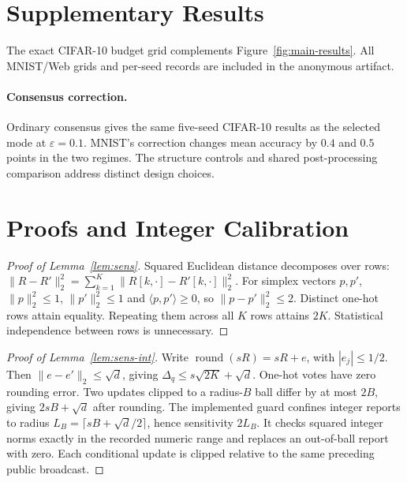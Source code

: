\appendix

\section{Supplementary Results}
\label{app:full-results}
The exact CIFAR-10 budget grid complements Figure~\ref{fig:main-results}.
All MNIST/Web grids and per-seed records are included in the anonymous artifact.









\paragraph{Consensus correction.}
Ordinary consensus gives the same five-seed CIFAR-10 results as the selected
mode at $\varepsilon=0.1$. MNIST's correction changes mean accuracy by $0.4$
and $0.5$ points in the two regimes. The structure controls and shared
post-processing comparison address distinct design choices.


\section{Proofs and Integer Calibration}
\label{app:proofs}

\begin{proof}[Proof of Lemma~\ref{lem:sens}]
Squared Euclidean distance decomposes over rows:
$\|R-R'\|_2^2=\sum_{k=1}^K\|R[k,\cdot]-R'[k,\cdot]\|_2^2$.
For simplex vectors $p,p'$, $\|p\|_2^2\le1$, $\|p'\|_2^2\le1$ and
$\langle p,p'\rangle\ge0$, so $\|p-p'\|_2^2\le2$.
Distinct one-hot rows attain equality. Repeating them across all $K$ rows
attains $2K$. Statistical independence between rows is unnecessary.
\end{proof}

\begin{proof}[Proof of Lemma~\ref{lem:sens-int}]
Write $\operatorname{round}(sR)=sR+e$, with $|e_j|\le1/2$.
Then $\|e-e'\|_2\le\sqrt d$, giving
$\Delta_q\le s\sqrt{2K}+\sqrt d$. One-hot votes have zero rounding error.
Two updates clipped to a radius-$B$ ball differ by at most $2B$,
giving $2sB+\sqrt d$ after rounding. The implemented guard confines
integer reports to radius $L_B=\lceil sB+\sqrt d/2\rceil$, hence sensitivity
$2L_B$. It checks squared integer norms exactly in the recorded numeric
range and replaces an out-of-ball report with zero.
Each conditional update is clipped relative to the same preceding public broadcast.
\end{proof}

